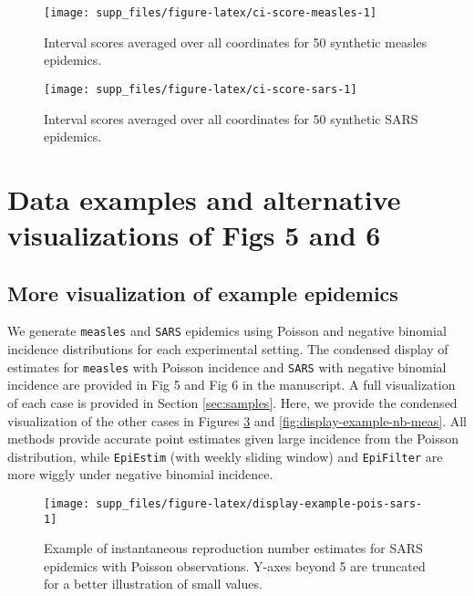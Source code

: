 \documentclass[
]{article}
\begin{document}
\begin{figure}[!ht]

{\centering \texttt{[image: supp\_files/figure-latex/ci-score-measles-1]} 

}

\caption{Interval scores averaged over all coordinates for 50 synthetic measles epidemics.}\label{fig:ci-score-measles}
\end{figure}

\begin{figure}[!ht]

{\centering \texttt{[image: supp\_files/figure-latex/ci-score-sars-1]} 

}

\caption{Interval scores averaged over all coordinates for 50 synthetic SARS epidemics.}\label{fig:ci-score-sars}
\end{figure}

\clearpage

\section{Data examples and alternative visualizations of Figs 5 and 6}\label{data-examples-and-alternative-visualizations-of-figs-5-and-6}

\subsection{More visualization of example epidemics}\label{more-visualization-of-example-epidemics}

We generate \texttt{measles} and \texttt{SARS} epidemics using Poisson and negative binomial
incidence distributions for each experimental setting. The condensed display of estimates
for \texttt{measles} with Poisson incidence and \texttt{SARS} with negative binomial incidence are provided in
Fig 5 and Fig 6 in the manuscript. A full visualization of each case is provided
in Section \ref{sec:samples}.
Here, we provide the condensed visualization of the other cases in Figures
\ref{fig:display-example-pois-sars} and \ref{fig:display-example-nb-meas}.
All methods provide accurate point estimates given large incidence from the Poisson
distribution, while \texttt{EpiEstim} (with weekly sliding window) and \texttt{EpiFilter} are
more wiggly under negative binomial incidence.

\begin{figure}[!ht]

{\centering \texttt{[image: supp\_files/figure-latex/display-example-pois-sars-1]} 

}

\caption{Example of instantaneous reproduction number estimates for SARS epidemics with Poisson observations. Y-axes beyond 5 are truncated for a better illustration of small values.}\label{fig:display-example-pois-sars}
\end{figure}
\end{document}

